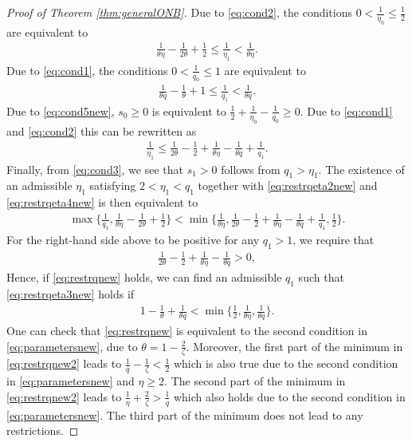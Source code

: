 \documentclass[10pt,a4paper]{amsart}
\begin{document}
\begin{proof}[Proof of Theorem \ref{thm:generalONB}]
Due to \eqref{eq:cond2}, the conditions $0<\frac{1}{\eta_0}\leq \frac12$ are equivalent to 
\begin{align}
\label{eq:restrqeta2new}
\frac{1}{\theta \eta} - \frac{1}{2\theta}+\frac12\leq \frac{1}{\eta_1}<\frac{1}{\theta \eta}.
\end{align} 
Due to \eqref{eq:cond1}, the conditions $0<\frac{1}{q_0}\leq 1$ are equivalent to 
\begin{align}
\label{eq:restrqeta3new}
\frac{1}{\theta q} - \frac{1}{\theta}+1\leq\frac{1}{q_1}<\frac{1}{\theta q}.
\end{align} 
Due to \eqref{eq:cond5new}, $s_0\geq 0$ is equivalent to $\frac{1}{2} + \frac{1}{\eta_0}- \frac{1}{q_0}\geq 0$. Due to \eqref{eq:cond1} and \eqref{eq:cond2} this can be rewritten as
\begin{align}\label{eq:restrqeta4new}
\frac{1}{\eta_1}\leq \frac{1}{2\theta} - \frac{1}{2} + \frac{1}{\theta \eta} - \frac{1}{\theta q} + \frac{1}{q_1}. 
\end{align}
Finally, from \eqref{eq:cond3}, we see that $s_1>0$ follows from $q_1>\eta_1$. 
The existence of an admissible $\eta_1$ satisfying  $2<\eta_1<q_1$ together with \eqref{eq:restrqeta2new} and \eqref{eq:restrqeta4new} is then equivalent to 
\begin{align}
\label{eq:restreta_1 combined}
\max\Big\{\frac{1}{q_1}, \frac{1}{\theta \eta} - \frac{1}{2\theta}+\frac12\Big\}<\min\Big\{\frac{1}{\theta \eta}, \frac{1}{2\theta} - \frac{1}{2} + \frac{1}{\theta \eta} - \frac{1}{\theta q} + \frac{1}{q_1}, \frac12\Big\}.
\end{align}
For the right-hand side above to be positive for any $q_1>1$, we require that 
\begin{align}
\label{eq:restrqnew}
\frac{1}{2\theta} - \frac{1}{2} + \frac{1}{\theta \eta} - \frac{1}{\theta q}>0,
\end{align}
Hence, if \eqref{eq:restrqnew} holds,
we can find an admissible $q_1$ such that \eqref{eq:restrqeta3new} holds 
if
\begin{align}\label{eq:restrqnew2}
1 - \frac{1}{\theta} +\frac{1}{\theta q} <\min\Big\{\frac12,\frac{1}{\theta \eta}, \frac{1}{\theta q}\Big\}.
\end{align}
One can check that \eqref{eq:restrqnew} is equivalent to the second condition in \eqref{eq:parametersnew}, due to $\theta = 1-\tfrac{2}{\zeta}$. Moreover, 
the first part of the minimum in \eqref{eq:restrqnew2} leads to $\frac{1}{q} - \frac{1}{\zeta} <\frac12$ which is also true due to the second condition in \eqref{eq:parametersnew} and $\eta\geq 2$. The second part of the minimum in \eqref{eq:restrqnew2} leads to $\frac{1}{\eta}  +\frac{2}{\zeta} > \frac{1}{q}$ which also holds due to the second condition in \eqref{eq:parametersnew}. The third part of the minimum does not lead to any restrictions. 
\end{proof}
\end{document}
